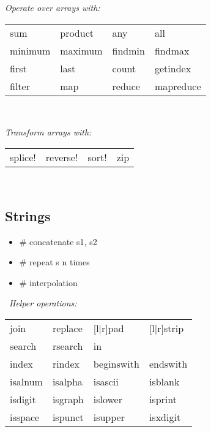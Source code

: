 \textit{Operate over arrays with:}\\
{\scriptsize
\begin{tabular}{l l l l}
    sum & product & any & all \\
    minimum & maximum & findmin & findmax \\
    first & last & count & getindex \\
    filter & map & reduce & mapreduce \\
\end{tabular}} \

\textit{Transform arrays with:}\\
{\scriptsize
\begin{tabular}{l l l l}
    splice! & reverse! & sort! & zip \\
\end{tabular}} \ \\

\subsection*{Strings}
\begin{itemize}
    \item {} \# concatenate s1, s2
    \item {} \# repeat s n times
    \item {} \# interpolation
\end{itemize} \
\textit{Helper operations:}\\
\begin{tabular}{l l l l}
    join      & replace       & [l|r]pad      & [l|r]strip \\
    search      & rsearch      & in    &  \\
    index      & rindex      & beginswith    & endswith \\
    isalnum & isalpha & isascii & isblank \\
    isdigit & isgraph & islower & isprint \\
    isspace & ispunct & isupper & isxdigit \\
\end{tabular} \


